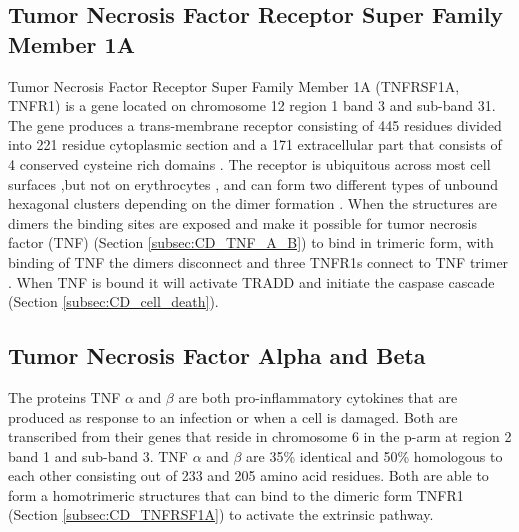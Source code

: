 \subsection{Tumor Necrosis Factor Receptor Super Family Member 1A}
Tumor Necrosis Factor Receptor Super Family Member 1A (TNFRSF1A, TNFR1) is a gene located on chromosome 12 region 1 band 3 and sub-band 31. The gene produces a trans-membrane receptor consisting of 445 residues divided into 221 residue cytoplasmic section and a 171 extracellular part that consists of 4 conserved cysteine rich domains \cite{}.
The receptor is ubiquitous across most cell surfaces ,but not on erythrocytes \cite{}, and can form two different types of unbound hexagonal clusters depending on the dimer formation \cite{}. 
When the structures are dimers the binding sites are exposed and make it possible for tumor necrosis factor (TNF) (Section \ref{subsec:CD_TNF_A_B}) to bind in trimeric form, with binding of TNF the dimers disconnect and three TNFR1s connect to TNF trimer \cite{}.
When TNF is bound it will activate TRADD \cite{} and initiate the caspase cascade \cite{} (Section \ref{subsec:CD_cell_death}).
\label{subsec:CD_TNFRSF1A}

\subsection{Tumor Necrosis Factor Alpha and Beta}
The proteins TNF $\alpha$ and $\beta$ are both pro-inflammatory cytokines that are produced as response to an infection or when a cell is damaged. Both are transcribed from their genes that reside in chromosome 6 in the p-arm at region 2 band 1 and sub-band 3. TNF $\alpha$ and $\beta$ are 35\% identical and 50\% homologous to each other consisting out of 233 and 205 amino acid residues. Both are able to form a homotrimeric structures that can bind to the dimeric form TNFR1 (Section \ref{subsec:CD_TNFRSF1A}) to activate the extrinsic pathway\cite{}. 


\label{subsec:CD_TNF_A_B}